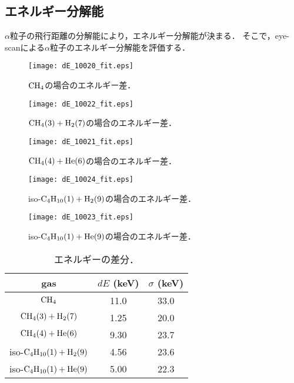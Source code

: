 \documentclass[../master]{subfiles}
\begin{document}
\subsection{エネルギー分解能}
$\alpha$粒子の飛行距離の分解能により，エネルギー分解能が決まる．
そこで，eye-scanによる$\alpha$粒子のエネルギー分解能を評価する．
\begin{figure}
  \centering
  \begin{minipage}{0.45\columnwidth}
    \centering
    \texttt{[image: dE\_10020\_fit.eps]}
    \caption{$\rm CH_{4}$の場合のエネルギー差．}
    \label{fig::dE_ch4}
  \end{minipage}
\end{figure}
\begin{figure}
  \begin{minipage}{0.45\columnwidth}
    \centering
    \texttt{[image: dE\_10022\_fit.eps]}
    \caption{$\rm CH_{4} (3) + H_{2} (7)$の場合のエネルギー差．}
    \label{fig::dE_ch4_h2}
  \end{minipage}
  \centering
  \begin{minipage}{0.45\columnwidth}
    \centering
    \texttt{[image: dE\_10021\_fit.eps]}
    \caption{$\rm CH_{4} (4) + He(6)$の場合のエネルギー差．}
    \label{fig::dE_ch4_he}
  \end{minipage}
\end{figure}
\begin{figure}
  \begin{minipage}{0.45\columnwidth}
    \centering
    \texttt{[image: dE\_10024\_fit.eps]}
    \caption{iso-$\rm C_{4}H_{10} (1) + H_{2} (9)$の場合のエネルギー差．}
    \label{fig::dE_ic4h10_h2}
  \end{minipage}
  \centering
  \begin{minipage}{0.45\columnwidth}
    \centering
    \texttt{[image: dE\_10023\_fit.eps]}
    \caption{iso-$\rm C_{4}H_{10} (1) + He (9)$の場合のエネルギー差．}
    \label{fig::dE_ic4h10_he}
  \end{minipage}
\end{figure}
\begin{table}
  \centering
  \caption{エネルギーの差分．}
  \label{tab::energy_resolution}
  \begin{tabular}{ccc}
    \toprule
    gas & $dE$ (keV) & $\sigma$ (keV) \\
    \midrule
    $\rm CH_{4}$ & 11.0 & 33.0  \\
    $\rm CH_{4} (3) + H_{2} (7)$ & 1.25 & 20.0 \\
    $\rm CH_{4} (4) + He (6)$ & 9.30 & 23.7 \\
    iso-$\rm C_{4}H_{10} (1) + H_{2} (9)$ & 4.56 & 23.6 \\
    iso-$\rm C_{4}H_{10} (1) + He (9)$ & 5.00 & 22.3 \\
    \bottomrule
  \end{tabular}
\end{table}
\end{document}
